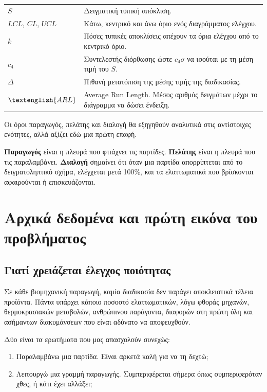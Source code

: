 \documentclass[12pt,a4paper]{article}
\newcommand{\ARL}{\textenglish{ARL}}
\begin{document}
\begin{longtable}{>{\centering\arraybackslash}p{2.0cm} p{12.2cm}}
\(S\) & Δειγματική τυπική απόκλιση. \\
\(LCL\), \(CL\), \(UCL\) & Κάτω, κεντρικό και άνω όριο ενός διαγράμματος ελέγχου. \\
\(k\) & Πόσες τυπικές αποκλίσεις απέχουν τα όρια ελέγχου από το κεντρικό όριο. \\
\(c_4\) & Συντελεστής διόρθωσης ώστε \(c_4\sigma\) να ισούται με τη μέση τιμή του \(S\). \\
\(\Delta\) & Πιθανή μετατόπιση της μέσης τιμής της διαδικασίας. \\
\(\ARL\) & Average Run Length. Μέσος αριθμός δειγμάτων μέχρι το διάγραμμα να δώσει ένδειξη. \\
\bottomrule
\end{longtable}

Οι όροι παραγωγός, πελάτης και διαλογή θα εξηγηθούν αναλυτικά στις
αντίστοιχες ενότητες, αλλά αξίζει εδώ μια πρώτη επαφή.

\textbf{Παραγωγός} είναι η πλευρά που φτιάχνει τις παρτίδες. \textbf{Πελάτης}
είναι η πλευρά που τις παραλαμβάνει. \textbf{Διαλογή} σημαίνει ότι όταν μια
παρτίδα απορρίπτεται από το δειγματοληπτικό σχήμα, ελέγχεται μετά 100\%, και
τα ελαττωματικά που βρίσκονται αφαιρούνται ή επισκευάζονται.

\newpage

\section{Αρχικά δεδομένα και πρώτη εικόνα του προβλήματος}

\subsection{Γιατί χρειάζεται έλεγχος ποιότητας}

Σε κάθε βιομηχανική παραγωγή, καμία διαδικασία δεν παράγει αποκλειστικά τέλεια
προϊόντα. Πάντα υπάρχει κάποιο ποσοστό ελαττωματικών, λόγω φθοράς μηχανών,
θερμοκρασιακών μεταβολών, ανθρώπινου παράγοντα, διαφορών στη πρώτη ύλη και
ασήμαντων διακυμάνσεων που είναι αδύνατο να αποφευχθούν.

Δύο είναι τα ερωτήματα που μας απασχολούν συνεχώς:

\begin{enumerate}[leftmargin=2.2em]
    \item Παραλαμβάνω μια παρτίδα. Είναι αρκετά καλή για να τη δεχτώ;
    \item Λειτουργώ μια γραμμή παραγωγής. Συμπεριφέρεται σήμερα όπως
    συμπεριφερόταν χθες, ή κάτι έχει αλλάξει;
\end{enumerate}
\end{document}
